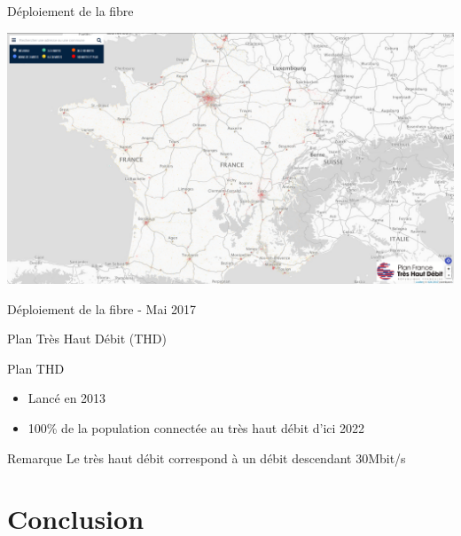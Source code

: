 \documentclass{beamer}
\begin{document}
\begin{frame}{Déploiement de la fibre}
    \centerline{\includegraphics[trim = 0cm 0cm 15cm 0cm, clip=true, scale=0.15]{fibre.png}}
    \centerline{Déploiement de la fibre - Mai 2017}
\end{frame}

\begin{frame}{Plan Très Haut Débit (THD)}
    \begin{block}{Plan THD}
    \begin{itemize}
         \item Lancé en 2013
         \item 100\% de la population connectée au très haut débit d'ici 2022
    \end{itemize}
    \end{block}
    \begin{alertblock}{Remarque}
        Le très haut débit correspond à un débit descendant \geq 30Mbit/s
    \end{alertblock}
\end{frame}
\section*{Conclusion}
\end{document}
